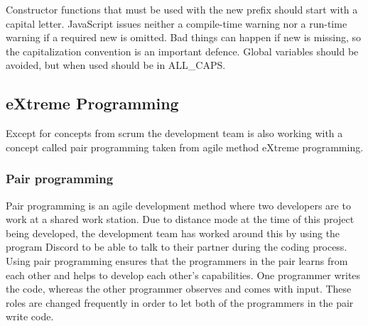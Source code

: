 Constructor functions that must be used with the new prefix should start with a capital letter. JavaScript issues neither a compile-time warning nor a run-time warning if a required new is omitted. Bad things can happen if new is missing, so the capitalization convention is an important defence. Global variables should be avoided, but when used should be in ALL\_CAPS.

\subsection{eXtreme Programming}
Except for concepts from scrum the development team is also working with a concept called pair programming taken from agile method eXtreme programming. 
\subsubsection{Pair programming}
Pair programming is an agile development method where two developers are to work at a shared work station. Due to distance mode at the time of this project being developed, the development team has worked around this by using the program Discord to be able to talk to their partner during the coding process. Using pair programming ensures that the programmers in the pair learns from each other and helps to develop each other's capabilities. One programmer writes the code, whereas the other programmer observes and comes with input. These roles are changed frequently in order to let both of the programmers in the pair write code. 